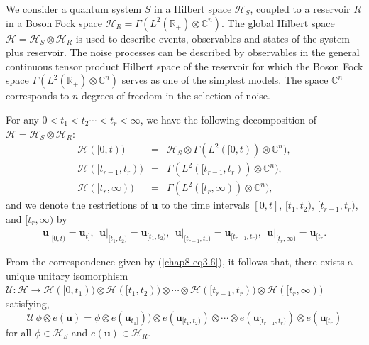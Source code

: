 We consider a quantum system $S$  in a Hilbert space $\mathcal{H}_S$, coupled to a reservoir $R$ in a Boson Fock space $\mathcal{H}_R = \Gamma (L^2 (\mathbb{R}_+) \otimes \mathbb{C}^n)$.  The global Hilbert space $\mathcal{H}=\mathcal{H}_S\otimes\mathcal{H}_R$ is used to describe events, observables and states of the system plus reservoir. The noise processes can be described by observables in the general continuous tensor product Hilbert space of the reservoir for which  the Boson Fock space $\Gamma (L^2 (\mathbb{R}_+)\otimes \mathbb{C}^n)$ serves as one of the simplest models. The space $\mathbb{C}^n$ corresponds to $n$ degrees of freedom in the selection of noise. 

For any $0<t_1<t_2\cdots <t_r<\infty$, we have the following decomposition of $\mathcal{H}=\mathcal{H}_S\otimes \mathcal{H}_R$: 
\begin{eqnarray*}
	\mathcal{H}([0,t))&=&\mathcal{H}_S\otimes \Gamma(L^2([0,t))\otimes \mathbb{C}^n),   \\
	\mathcal{H}([t_{r-1},t_{r})) &=& \Gamma(L^2([t_{r-1},t_{r}))\otimes \mathbb{C}^n), \\
	\mathcal{H}([t_r,\infty)) &=& \Gamma(L^2([t_r,\infty))\otimes \mathbb{C}^n), 														
\end{eqnarray*} 
and we denote the restrictions of $\mathbf{u}$ to the time intervals $[0,t]$, $[t_1,t_2)$, $[t_{r-1},t_{r})$, and $[t_r,\infty)$ by 
\begin{eqnarray*}
	\left.\mathbf{u}\right\vert_{[0,t)}=\mathbf{u}_{t]},  \ \  \left.\mathbf{u}\right\vert_{[t_1,t_2)}=\mathbf{u}_{[t_{1},t_{2})},  \ \ 
	\left.\mathbf{u}\right\vert_{[t_{r-1},t_{r})}=\mathbf{u}_{[t_{r-1},t_{r})},  \ \ 
	\left.\mathbf{u}\right\vert_{[t_r,\infty)}=\mathbf{u}_{[t_r}.
\end{eqnarray*} 

From the correspondence given by (\ref{chap8-eq3.6}), it follows that, there exists a unique unitary isomorphism $\mathcal{U}: \mathcal{H} \rightarrow \mathcal{H}([0,t_{1})) \otimes 
\mathcal{H}([t_{1}, t_{2})) \otimes \cdots \otimes \mathcal{H}([t_{r-1},t_{r})) \otimes \mathcal{H}([t_{r},\infty))$ satisfying,     
\begin{equation}
\mathcal{U}\, \phi\otimes e(\mathbf{u}) = \phi\otimes e(\mathbf{u}_{t_1]})) \otimes e(\mathbf{u}_{[t_1,t_2)})\otimes \cdots 
\otimes e(\mathbf{u}_{[t_{r-1},t_r)}) \otimes e(\mathbf{u}_{[t_r})   \label{chap8-eq3.8}
\end{equation}
for all $\phi\in \mathcal{H}_S$ and  $e(\mathbf{u})\in \mathcal{H}_R$. 

